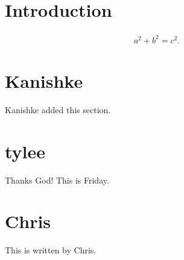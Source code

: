 \documentclass{article}
\begin{document}
\section{Introduction}

\begin{align}
    a^2 + b^2 = c^2 .
\end{align}
 
\section{Kanishke}
Kanishke added this section.


\section{tylee}

Thanks God! This is Friday.

\section{Chris}

This is written by Chris.
\end{document}
